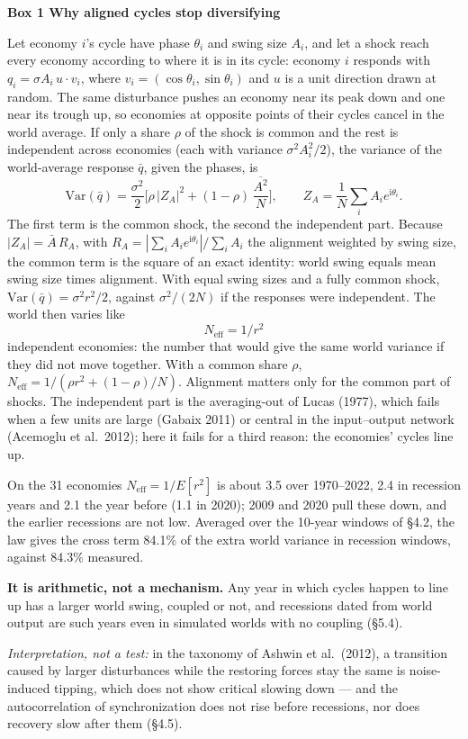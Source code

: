 \documentclass[11pt,a4paper]{article}
\begin{document}
\begin{tcolorbox}[enhanced,breakable,colback=boxgrey,colframe=boxgrey,boxrule=0pt,arc=0pt,left=10pt,right=10pt,top=8pt,bottom=8pt,before upper={\setlength{\parskip}{5pt}}]
\textbf{Box 1 \textbar{} Why aligned cycles stop diversifying}

Let economy \(i\)'s cycle have phase \(\theta_i\) and swing size \(A_i\), and let a shock reach every economy according to where it is in its cycle: economy \(i\) responds with \(q_i = \sigma A_i\, u\cdot v_i\), where \(v_i = (\cos\theta_i,
\sin\theta_i)\) and \(u\) is a unit direction drawn at random. The same disturbance pushes an economy near its peak down and one near its trough up, so economies at opposite points of their cycles cancel in the world average. If only a share \(\rho\) of the shock is common and the rest is independent across economies (each with variance \(\sigma^2A_i^2/2\)), the variance of the world-average response \(\bar q\), given the phases, is \[\mathrm{Var}(\bar q) = \frac{\sigma^2}{2}\Big[\rho\,|Z_A|^2 + (1-\rho)\,\frac{\overline{A^2}}{N}\Big], \qquad Z_A = \frac{1}{N}\sum_i A_i e^{\mathrm{i}\theta_i}.\] The first term is the common shock, the second the independent part. Because \(|Z_A| = \bar A\, R_A\), with \(R_A = |\sum_i A_i e^{\mathrm{i}\theta_i}| / \sum_i A_i\) the alignment weighted by swing size, the common term is the square of an exact identity: world swing equals mean swing size times alignment. With equal swing sizes and a fully common shock, \(\mathrm{Var}(\bar q) = \sigma^2 r^2/2\), against \(\sigma^2/(2N)\) if the responses were independent. The world then varies like \[N_{\mathrm{eff}} = 1/r^2\] independent economies: the number that would give the same world variance if they did not move together. With a common share \(\rho\), \(N_{\mathrm{eff}} = 1/(\rho r^2 + (1-\rho)/N)\). Alignment matters only for the common part of shocks. The independent part is the averaging-out of Lucas (1977), which fails when a few units are large (Gabaix 2011) or central in the input–output network (Acemoglu et al.~2012); here it fails for a third reason: the economies' cycles line up.

On the 31 economies \(N_{\mathrm{eff}} = 1/E[r^2]\) is about 3.5 over 1970–2022, 2.4 in recession years and 2.1 the year before (1.1 in 2020); 2009 and 2020 pull these down, and the earlier recessions are not low. Averaged over the 10-year windows of §4.2, the law gives the cross term 84.1\% of the extra world variance in recession windows, against 84.3\% measured.

\textbf{It is arithmetic, not a mechanism.} Any year in which cycles happen to line up has a larger world swing, coupled or not, and recessions dated from world output are such years even in simulated worlds with no coupling (§5.4).

\emph{Interpretation, not a test:} in the taxonomy of Ashwin et al.~(2012), a transition caused by larger disturbances while the restoring forces stay the same is noise-induced tipping, which does not show critical slowing down — and the autocorrelation of synchronization does not rise before recessions, nor does recovery slow after them (§4.5).
\end{tcolorbox}
\end{document}

